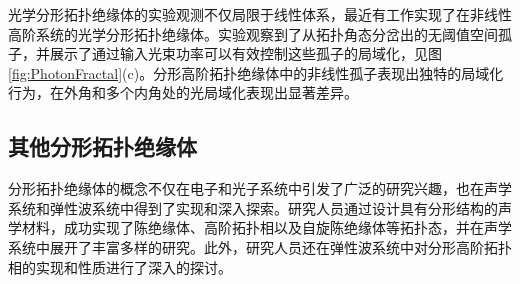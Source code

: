 光学分形拓扑绝缘体的实验观测不仅局限于线性体系，最近有工作实现了在非线性高阶系统的光学分形拓扑绝缘体\cite{zhong2024observation}。实验观察到了从拓扑角态分岔出的无阈值空间孤子，并展示了通过输入光束功率可以有效控制这些孤子的局域化，见图\ref{fig:PhotonFractal}(c)。分形高阶拓扑绝缘体中的非线性孤子表现出独特的局域化行为，在外角和多个内角处的光局域化表现出显著差异。

\subsection{其他分形拓扑绝缘体}
分形拓扑绝缘体的概念不仅在电子和光子系统中引发了广泛的研究兴趣，也在声学系统和弹性波系统中得到了实现和深入探索。研究人员通过设计具有分形结构的声学材料，成功实现了陈绝缘体\cite{li2023fractality}、高阶拓扑相\cite{LI20222040}以及自旋陈绝缘体\cite{lai2024spin}等拓扑态，并在声学系统中展开了丰富多样的研究。此外，研究人员还在弹性波系统中对分形高阶拓扑相的实现和性质进行了深入的探讨\cite{ma2023elastic,dorin2024uncovering}。

